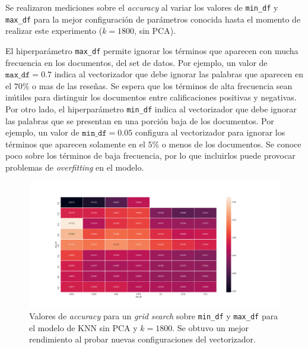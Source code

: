 
Se realizaron mediciones sobre el \textit{accuracy} al variar los valores de
\texttt{min\_df} y \texttt{max\_df} para la mejor configuración de parámetros
conocida hasta el momento de realizar este experimento ($k=1800$, sin PCA).

El hiperparámetro \texttt{max\_df} permite ignorar los términos que aparecen
con mucha frecuencia en los documentos, del set de datos. Por ejemplo, un valor
de $\mathtt{max\_df}=0.7$ indica al vectorizador que debe ignorar las palabras
que aparecen en el $70\%$ o mas de las reseñas.
Se espera que los términos de alta frecuencia sean inútiles para distinguir los
documentos entre calificaciones positivas y negativas.
%
Por otro lado, el hiperparámetro \texttt{min\_df} indica al vectorizador que
debe ignorar las palabras que se presentan en una porción baja de los
documentos. Por ejemplo, un valor de $\mathtt{min\_df}=0.05$ configura al
vectorizador para ignorar los términos que aparecen solamente en el $5\%$ o
menos de los documentos.
Se conoce poco sobre los términos de baja frecuencia, por lo que incluirlos
puede provocar problemas de \textit{overfitting} en el modelo.

\begin{figure}[h]
\includegraphics[width=\textwidth]{./img/exp_maxmindf.png}
\centering
\caption{
Valores de \textit{accuracy} para un \textit{grid search} sobre
\texttt{min\_df} y \texttt{max\_df} para el modelo de KNN sin PCA y $k=1800$.
Se obtuvo un mejor rendimiento al probar nuevas configuraciones del
vectorizador.
}
\label{fig:param-big}
\end{figure}

